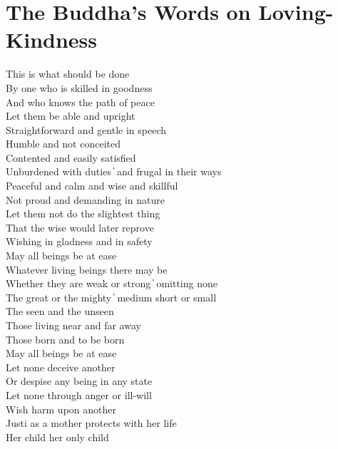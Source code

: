 
\clearpage

\section{The Buddha's Words on Loving-Kindness}

\begin{leader}
\end{leader}

This is what should be done\\
By one who is skilled in goodness\\
And who knows the path of peace\\
Let them be able and upright\\
Straightforward and gentle in speech\\
Humble and not conceited\\
Contented and easily satisfied\\
Unburdened with duties  ̓  and frugal in their ways\\
Peaceful and calm and wise and skillful\\
Not proud and demanding in nature\\
Let them not do the slightest thing\\
That the wise would later reprove\\
Wishing in gladness and in safety\\
May all beings be at ease\\
Whatever living beings there may be\\
Whether they are weak or strong  ̓  omitting none\\
The great or the mighty  ̓  medium short or small\\
The seen and the unseen\\
Those living near and far away\\
Those born and to be born\\
May all beings be at ease\\
Let none deceive another\\
Or despise any being in any state\\
Let none through anger or ill-will\\
Wish harm upon another\\
Justi as a mother protects with her life\\
Her child her only child\\
